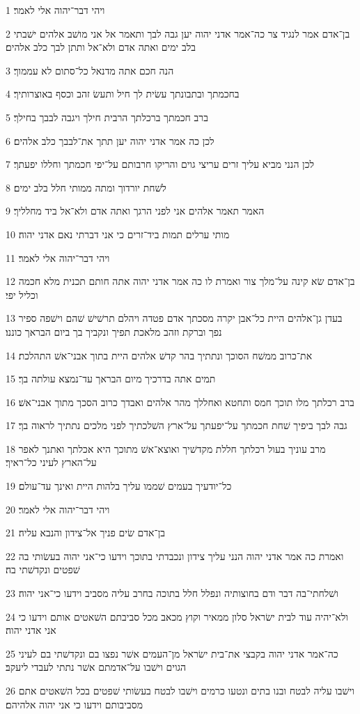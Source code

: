 \par 1 ויהי דבר־יהוה אלי לאמר׃
\par 2 בן־אדם אמר לנגיד צר כה־אמר אדני יהוה יען גבה לבך ותאמר אל אני מושׁב אלהים ישׁבתי בלב ימים ואתה אדם ולא־אל ותתן לבך כלב אלהים׃
\par 3 הנה חכם אתה מדנאל כל־סתום לא עממוך׃
\par 4 בחכמתך ובתבונתך עשׂית לך חיל ותעשׂ זהב וכסף באוצרותיך׃
\par 5 ברב חכמתך ברכלתך הרבית חילך ויגבה לבבך בחילך׃
\par 6 לכן כה אמר אדני יהוה יען תתך את־לבבך כלב אלהים׃
\par 7 לכן הנני מביא עליך זרים עריצי גוים והריקו חרבותם על־יפי חכמתך וחללו יפעתך׃
\par 8 לשׁחת יורדוך ומתה ממותי חלל בלב ימים׃
\par 9 האמר תאמר אלהים אני לפני הרגך ואתה אדם ולא־אל ביד מחלליך׃
\par 10 מותי ערלים תמות ביד־זרים כי אני דברתי נאם אדני יהוה׃
\par 11 ויהי דבר־יהוה אלי לאמר׃
\par 12 בן־אדם שׂא קינה על־מלך צור ואמרת לו כה אמר אדני יהוה אתה חותם תכנית מלא חכמה וכליל יפי׃
\par 13 בעדן גן־אלהים היית כל־אבן יקרה מסכתך אדם פטדה ויהלם תרשׁישׁ שׁהם וישׁפה ספיר נפך וברקת וזהב מלאכת תפיך ונקביך בך ביום הבראך כוננו׃
\par 14 את־כרוב ממשׁח הסוכך ונתתיך בהר קדשׁ אלהים היית בתוך אבני־אשׁ התהלכת׃
\par 15 תמים אתה בדרכיך מיום הבראך עד־נמצא עולתה בך׃
\par 16 ברב רכלתך מלו תוכך חמס ותחטא ואחללך מהר אלהים ואבדך כרוב הסכך מתוך אבני־אשׁ׃
\par 17 גבה לבך ביפיך שׁחת חכמתך על־יפעתך על־ארץ השׁלכתיך לפני מלכים נתתיך לראוה בך׃
\par 18 מרב עוניך בעול רכלתך חללת מקדשׁיך ואוצא־אשׁ מתוכך היא אכלתך ואתנך לאפר על־הארץ לעיני כל־ראיך׃
\par 19 כל־יודעיך בעמים שׁממו עליך בלהות היית ואינך עד־עולם׃
\par 20 ויהי דבר־יהוה אלי לאמר׃
\par 21 בן־אדם שׂים פניך אל־צידון והנבא עליה׃
\par 22 ואמרת כה אמר אדני יהוה הנני עליך צידון ונכבדתי בתוכך וידעו כי־אני יהוה בעשׂותי בה שׁפטים ונקדשׁתי בה׃
\par 23 ושׁלחתי־בה דבר ודם בחוצותיה ונפלל חלל בתוכה בחרב עליה מסביב וידעו כי־אני יהוה׃
\par 24 ולא־יהיה עוד לבית ישׂראל סלון ממאיר וקוץ מכאב מכל סביבתם השׁאטים אותם וידעו כי אני אדני יהוה׃
\par 25 כה־אמר אדני יהוה בקבצי את־בית ישׂראל מן־העמים אשׁר נפצו בם ונקדשׁתי בם לעיני הגוים וישׁבו על־אדמתם אשׁר נתתי לעבדי ליעקב׃
\par 26 וישׁבו עליה לבטח ובנו בתים ונטעו כרמים וישׁבו לבטח בעשׂותי שׁפטים בכל השׁאטים אתם מסביבותם וידעו כי אני יהוה אלהיהם׃


